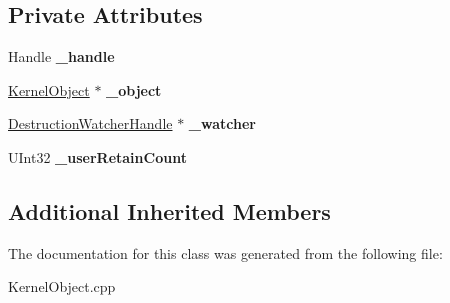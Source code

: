 \subsection*{Private Attributes}
\begin{DoxyCompactItemize}
\item 
\mbox{\label{class_kernel_object___internal_1_1_handled_object_af2ed8a56606b81ff99e248b12d6afc60}} 
Handle {\bfseries \+\_\+handle}
\item 
\mbox{\label{class_kernel_object___internal_1_1_handled_object_a3390ae3115a327f5f3b0eff98d9736f6}} 
\hyperlink{class_kernel_object}{Kernel\+Object} $\ast$ {\bfseries \+\_\+object}
\item 
\mbox{\label{class_kernel_object___internal_1_1_handled_object_a6914d534c688d8f1f9a8024eca66cb58}} 
\hyperlink{class_kernel_object_1_1_destruction_watcher_handle}{Destruction\+Watcher\+Handle} $\ast$ {\bfseries \+\_\+watcher}
\item 
\mbox{\label{class_kernel_object___internal_1_1_handled_object_a9e81627db5c4d453232489be54b93e80}} 
U\+Int32 {\bfseries \+\_\+user\+Retain\+Count}
\end{DoxyCompactItemize}
\subsection*{Additional Inherited Members}


The documentation for this class was generated from the following file\+:\begin{DoxyCompactItemize}
\item 
Kernel\+Object.\+cpp\end{DoxyCompactItemize}
